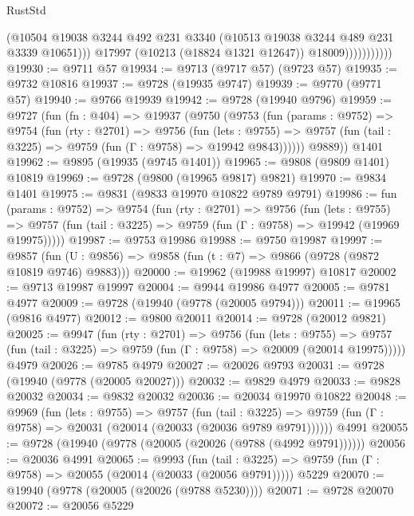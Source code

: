 \begin{lexlean}{RustStd}
\begin{coremodule}
                            (@10504
                              @19038
                              @3244
                              @492
                              @231
                              @3340
                              (@10513 @19038 @3244 @489 @231 @3339 @10651)))
                          @17997
                          (@10213 (@18824 @1321 @12647))
                          @18009)))))))))))
@19930 := @9711 @57
@19934 := @9713 (@9717 @57) (@9723 @57)
@19935 := @9732 @10816
@19937 := @9728 (@19935 @9747)
@19939 := @9770 (@9771 @57)
@19940 := @9766 @19939
@19942 := @9728 (@19940 @9796)
@19959 := @9727
    (fun (fn : @404) =>
    @19937
      (@9750
        (@9753
          (fun (params : @9752) =>
          @9754
            (fun (rty : @2701) =>
            @9756
              (fun (lets : @9755) =>
              @9757 (fun (tail : @3225) => @9759 (fun (Γ : @9758) => @19942 @9843))))))
        @9889))
    @1401
@19962 := @9895 (@19935 (@9745 @1401))
@19965 := @9808 (@9809 @1401) @10819
@19969 := @9728 (@9800 (@19965 @9817) @9821)
@19970 := @9834 @1401
@19975 := @9831 (@9833 @19970 @10822 @9789 @9791)
@19986 := fun (params : @9752) =>
  @9754
    (fun (rty : @2701) =>
    @9756
      (fun (lets : @9755) =>
      @9757 (fun (tail : @3225) => @9759 (fun (Γ : @9758) => @19942 (@19969 @19975)))))
@19987 := @9753 @19986
@19988 := @9750 @19987
@19997 := @9857
    (fun (U : @9856) => @9858 (fun (t : @7) => @9866 (@9728 (@9872 @10819 @9746) @9883)))
@20000 := @19962 (@19988 @19997) @10817
@20002 := @9713 @19987 @19997
@20004 := @9944 @19986 @4977
@20005 := @9781 @4977
@20009 := @9728 (@19940 (@9778 (@20005 @9794)))
@20011 := @19965 (@9816 @4977)
@20012 := @9800 @20011
@20014 := @9728 (@20012 @9821)
@20025 := @9947
    (fun (rty : @2701) =>
    @9756
      (fun (lets : @9755) =>
      @9757 (fun (tail : @3225) => @9759 (fun (Γ : @9758) => @20009 (@20014 @19975)))))
    @4979
@20026 := @9785 @4979
@20027 := @20026 @9793
@20031 := @9728 (@19940 (@9778 (@20005 @20027)))
@20032 := @9829 @4979
@20033 := @9828 @20032
@20034 := @9832 @20032
@20036 := @20034 @19970 @10822
@20048 := @9969
    (fun (lets : @9755) =>
    @9757
      (fun (tail : @3225) =>
      @9759 (fun (Γ : @9758) => @20031 (@20014 (@20033 (@20036 @9789 @9791))))))
    @4991
@20055 := @9728 (@19940 (@9778 (@20005 (@20026 (@9788 (@4992 @9791))))))
@20056 := @20036 @4991
@20065 := @9993
    (fun (tail : @3225) => @9759 (fun (Γ : @9758) => @20055 (@20014 (@20033 (@20056 @9791)))))
    @5229
@20070 := @19940 (@9778 (@20005 (@20026 (@9788 @5230))))
@20071 := @9728 @20070
@20072 := @20056 @5229

\end{coremodule}
\end{lexlean}
